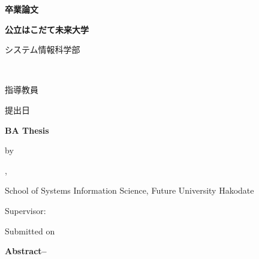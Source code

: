 \thispagestyle{empty}
\vspace*{1truemm}
\begin{center}
    \LARGE\bfseries
    卒業論文
\end{center}
\vfill
\begin{center}
    \LARGE\bfseries\jtitle
\end{center}
\vspace*{1em}
\vfill
\begin{center}
    \large\bfseries 公立はこだて未来大学\par%
    システム情報科学部~~\jdepartment\par%
    \jcourse~~\studentID
\end{center}
\vspace{0.3em}
\begin{center}
    \Large\bfseries\jauthor
\end{center}
\vspace*{1em}
\begin{center}
    \large 指導教員~~~~\jadvisor\par
    \vspace{0.5em}
    \large 提出日~~~~\jdate
\end{center}
\vspace*{3em}
\begin{center}
\textbf{\Large BA Thesis}\par
\vspace*{2em}
\textbf{\Large \etitle}\par
\vspace*{1em}
{\normalsize by}\par
\vspace*{1em}
{\large \eauthor}\par
\vspace*{1.5em}
\ecourse, \edepartment \par
School of Systems Information Science, Future University Hakodate

\vspace*{1em}
\normalsize Supervisor: \quad \eadvisor \par
\vspace*{0.5em}
Submitted on \edate
\end{center}

\clearpage
\thispagestyle{empty}
\noindent
\textbf{Abstract--}~
\eabstract

